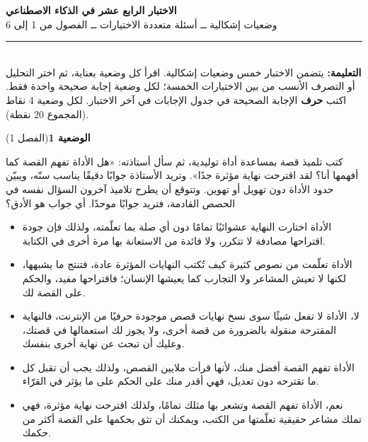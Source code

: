 \documentclass[11pt,a4paper]{article}
\begin{document}
\linespread{1.08}\selectfont
\begin{center}
{\LARGE\khatt\textbf{الاختبار الرابع عشر في الذكاء الاصطناعي}}\\[4pt]
{\normalsize وضعيات إشكالية ــ أسئلة متعددة الاختيارات ــ الفصول من 1 إلى 6}
\end{center}
\vspace{-2pt}\rule{\textwidth}{0.6pt}\\[2pt]
\textbf{التعليمة:} يتضمن الاختبار خمس وضعيات إشكالية. اقرأ كل وضعية بعناية، ثم اختر التحليل أو التصرف الأنسب
من بين الاختيارات الخمسة؛ لكل وضعية إجابة صحيحة واحدة فقط.
اكتب \textbf{حرف} الإجابة الصحيحة في جدول الإجابات في آخر الاختبار.
لكل وضعية 4 نقاط (المجموع 20 نقطة).
\vspace{4pt}

\noindent
{\large\khatt\textbf{الوضعية 1}}\hfill{\small(الفصل 1)}\par\nopagebreak\vspace{3pt}
\setlength{\fboxsep}{7pt}\colorbox{gray!10}{\parbox{\dimexpr\linewidth-14pt}{كتب تلميذ قصة بمساعدة أداة توليدية، ثم سأل أستاذته: «هل الأداة تفهم القصة كما أفهمها أنا؟ لقد اقترحت نهاية مؤثرة جدًا». وتريد الأستاذة جوابًا دقيقًا يناسب سنّه، ويبيّن حدود الأداة دون تهويل أو تهوين. وتتوقع أن يطرح تلاميذ آخرون السؤال نفسه في الحصص القادمة، فتريد جوابًا موحدًا. أي جواب هو الأدق؟}}\par\nopagebreak
\begin{itemize}[leftmargin=1.0cm, labelsep=6pt, itemsep=3pt, topsep=4pt, parsep=0pt]
  \item[\textbf{أ)}] الأداة اختارت النهاية عشوائيًا تمامًا دون أي صلة بما تعلّمته، ولذلك فإن جودة اقتراحها مصادفة لا تتكرر، ولا فائدة من الاستعانة بها مرة أخرى في الكتابة.
  \item[\textbf{ب)}] الأداة تعلّمت من نصوص كثيرة كيف تُكتب النهايات المؤثرة عادة، فتنتج ما يشبهها، لكنها لا تعيش المشاعر ولا التجارب كما يعيشها الإنسان؛ فاقتراحها مفيد، والحكم على القصة لك.
  \item[\textbf{ج)}] لا، الأداة لا تفعل شيئًا سوى نسخ نهايات قصص موجودة حرفيًا من الإنترنت، فالنهاية المقترحة منقولة بالضرورة من قصة أخرى، ولا يجوز لك استعمالها في قصتك، وعليك أن تبحث عن نهاية أخرى بنفسك.
  \item[\textbf{د)}] الأداة تفهم القصة أفضل منك، لأنها قرأت ملايين القصص، ولذلك يجب أن تقبل كل ما تقترحه دون تعديل، فهي أقدر منك على الحكم على ما يؤثر في القرّاء.
  \item[\textbf{هـ)}] نعم، الأداة تفهم القصة وتشعر بها مثلك تمامًا، ولذلك اقترحت نهاية مؤثرة، فهي تملك مشاعر حقيقية تعلّمتها من الكتب، ويمكنك أن تثق بحكمها على القصة أكثر من حكمك.
\end{itemize}
\end{document}
